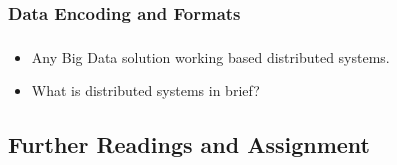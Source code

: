 \subsubsection{Data Encoding and Formats}
\begin{frame}
\frametitle{\subsecname}
\begin{itemize}[<+->]
\item Any Big Data solution working based distributed systems.
\item What is distributed systems in brief?
\end{itemize}
\end{frame}

\subsection{Further Readings and Assignment}



